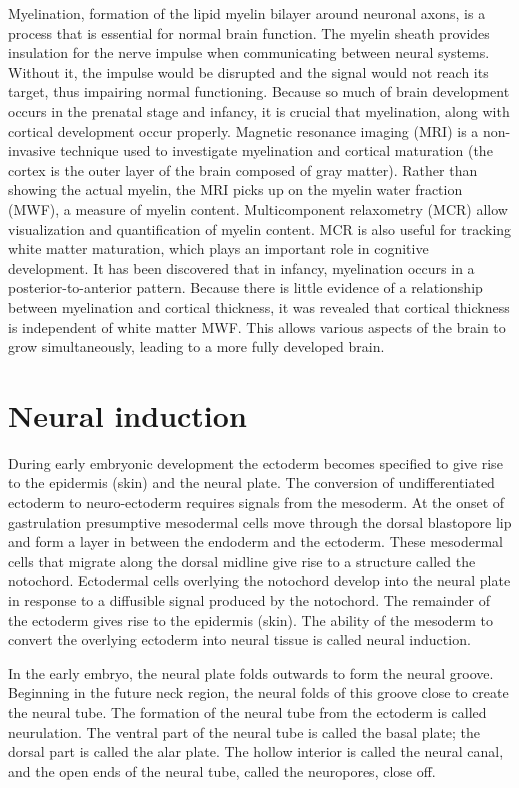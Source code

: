 Myelination, formation of the lipid myelin bilayer around neuronal axons, is a process that is essential for normal brain function. The myelin sheath provides insulation for the nerve impulse when communicating between neural systems. Without it, the impulse would be disrupted and the signal would not reach its target, thus impairing normal functioning. Because so much of brain development occurs in the prenatal stage and infancy, it is crucial that myelination, along with cortical development occur properly. Magnetic resonance imaging (MRI) is a non-invasive technique used to investigate myelination and cortical maturation (the cortex is the outer layer of the brain composed of gray matter). Rather than showing the actual myelin, the MRI picks up on the myelin water fraction (MWF), a measure of myelin content. Multicomponent relaxometry (MCR) allow visualization and quantification of myelin content. MCR is also useful for tracking white matter maturation, which plays an important role in cognitive development. It has been discovered that in infancy, myelination occurs in a posterior-to-anterior pattern. Because there is little evidence of a relationship between myelination and cortical thickness, it was revealed that cortical thickness is independent of white matter MWF. This allows various aspects of the brain to grow simultaneously, leading to a more fully developed brain.

\hypertarget{neural-induction}{%
\section{Neural induction}\label{neural-induction}}

During early embryonic development the ectoderm becomes specified to give rise to the epidermis (skin) and the neural plate. The conversion of undifferentiated ectoderm to neuro-ectoderm requires signals from the mesoderm. At the onset of gastrulation presumptive mesodermal cells move through the dorsal blastopore lip and form a layer in between the endoderm and the ectoderm. These mesodermal cells that migrate along the dorsal midline give rise to a structure called the notochord. Ectodermal cells overlying the notochord develop into the neural plate in response to a diffusible signal produced by the notochord. The remainder of the ectoderm gives rise to the epidermis (skin). The ability of the mesoderm to convert the overlying ectoderm into neural tissue is called neural induction.

In the early embryo, the neural plate folds outwards to form the neural groove. Beginning in the future neck region, the neural folds of this groove close to create the neural tube. The formation of the neural tube from the ectoderm is called neurulation. The ventral part of the neural tube is called the basal plate; the dorsal part is called the alar plate. The hollow interior is called the neural canal, and the open ends of the neural tube, called the neuropores, close off.

